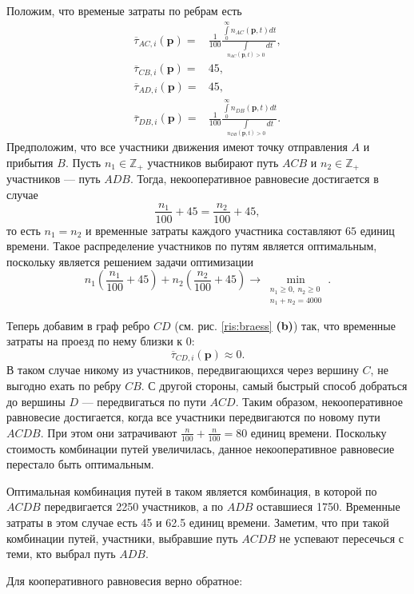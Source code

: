 \documentclass[12pt, a4paper]{article}
\begin{document}
Положим, что временые затраты по ребрам есть 
\begin{align*}
	\overline{\tau}_{AC, i} (\textbf{p}) = &\frac{1}{100}\frac{\int\limits_{0}^{\infty}n_{AC} (\textbf{p}, t)dt}{\int\limits_{n_{AC} (\textbf{p}, t) > 0}dt}, 
	\\
     \overline{\tau}_{CB, i} (\textbf{p}) = &45,
	\\
	\overline{\tau}_{AD, i} (\textbf{p}) = &45, 
	\\ 
	\overline{\tau}_{DB, i} (\textbf{p}) = &\frac{1}{100}\frac{\int\limits_{0}^{\infty}n_{DB} (\textbf{p}, t)dt}{\int\limits_{n_{DB} (\textbf{p}, t) > 0}dt}.
\end{align*}
Предположим, что все участники движения имеют точку отправления $A$ и прибытия $B$. Пусть $n_1 \in \mathbb{Z}_+$ участников выбирают путь $ACB$ и $n_2  \in \mathbb{Z}_+$ участников --- путь $ADB$. Тогда, некооперативное равновесие достигается в случае
$$\frac{n_1}{100} + 45 = \frac{n_2}{100} + 45,$$
то есть $n_1 = n_2$ и временные затраты каждого участника составляют $65$ единиц времени. Такое распределение участников по путям является оптимальным, поскольку является решением задачи оптимизации
$$n_1\left(\frac{n_1}{100} + 45\right) + n_2\left(\frac{n_2}{100} + 45\right) \rightarrow \min\limits_{\substack{n_1 \ge 0, \: n_2 \ge 0 \\ n_1 + n_2 = 4000}}.$$

Теперь добавим в граф ребро $CD$ (см. рис. \ref{ris:braess} \textbf{(b)}) так, что временные затраты на проезд по нему близки к 0:
$$\overline{\tau}_{CD, i} (\textbf{p}) \approx 0.$$
В таком случае никому из участников, передвигающихся через вершину $C$, не выгодно ехать по ребру $CB$. С другой стороны, самый быстрый способ добраться до вершины $D$ --- передвигаться по пути $ACD$. Таким образом, некооперативное равновесие достигается, когда все участники передвигаются по новому пути $ACDB$. При этом они затрачивают $\frac{n}{100} + \frac{n}{100} = 80$ единиц времени. Поскольку стоимость комбинации путей увеличилась, данное некооперативное равновесие перестало быть оптимальным.

Оптимальная комбинация путей в таком является комбинация, в которой по $ACDB$ передвигается 
2250 участников, а по $ADB$ оставшиеся 1750. Временные затраты в этом случае есть 45 и 62.5 единиц времени. Заметим, что при такой комбинации путей, участники, выбравшие путь  $ACDB$ не успевают пересечься с теми, кто выбрал путь $ADB$.

Для кооперативного равновесия верно обратное:
\end{document}
